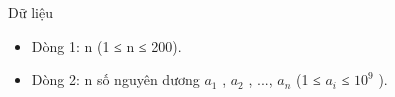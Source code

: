 Dữ liệu
\begin{itemize}
	\item     Dòng 1: n (1 ≤ n ≤ 200).   
	\item     Dòng 2: n số nguyên dương $a_{1}$    , $a_{2}$    , ..., $a_{n}$    (1 ≤ $a_{i}$    ≤ $10^{9}$    ).   
\end{itemize}